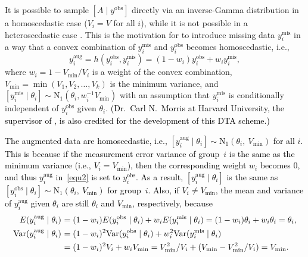 \documentclass[12pt]{article}
\begin{document}
It is possible to  sample $[A\mid y^{\textrm{obs}}]$ directly via an inverse-Gamma distribution in a homoscedastic case ($V_i=V$ for all $i$), while it is not possible in a heteroscedastic case \citep{everson2000inference}. This is the motivation for \cite{kelly2014advances}   to introduce missing data $y^{\textrm{mis}}_i$ in a  way that a convex combination of  $y^{\textrm{mis}}_i$  and $y^{\textrm{obs}}_i$ becomes homoscedastic, i.e., 
\begin{equation}\label{equ2}
y^{\textrm{aug}}_i=h(y^{\textrm{obs}}_i, y^{\textrm{mis}}_i)=(1-w_i)y^{\textrm{obs}}_i+w_iy^{\textrm{mis}}_i,
\end{equation}
where $w_i=1-V_\textrm{min} /V_i$ is a weight of the convex combination, $V_\textrm{min}=\min(V_1, V_2, \ldots, V_k)$ is the minimum variance, and $[y^{\textrm{mis}}_i\mid \theta_i]\sim \textrm{N}_1(\theta_i, w_i^{-1}V_{\textrm{min}})$  with an assumption that $y^{\textrm{mis}}_i$ is conditionally independent of $y^{\textrm{obs}}_i$ given $\theta_i$.  \textcolor{black}{(Dr.~Carl N.~Morris at Harvard University, the  supervisor of \cite{kelly2014advances}, is also credited for the development of this DTA scheme.)}


\textcolor{black}{The augmented data are homoscedastic, i.e., $[y^{\textrm{aug}}_i\mid \theta_i]\sim \textrm{N}_1(\theta_i,~ V_\textrm{min})$  for all $i$. This is because if the measurement error variance of group~$i$ is the same as the minimum variance (i.e., $V_i=V_{\textrm{min}}$), then the corresponding weight  $w_i$ becomes 0, and thus $y^{\textrm{aug}}_i$  in~\eqref{equ2} is set to $y^{\textrm{obs}}_i$. As a result, $[y^{\textrm{aug}}_i\mid \theta_i]$ is the same as $[y^{\textrm{obs}}_i\mid \theta_i]\sim \textrm{N}_{1}(\theta_i,~ V_{\textrm{min}})$ for group~$i$. Also, if  $V_i\neq V_{\textrm{min}}$, the mean and variance of $y^{\textrm{aug}}_i$ given $\theta_i$ are still $\theta_i$ and $V_{\textrm{min}}$, respectively, because}
\begin{align}
\textcolor{black}{E(y^{\textrm{aug}}_i\mid \theta_i)}~&\textcolor{black}{=(1-w_i)E(y^{\textrm{obs}}_i\mid\theta_i)+w_iE(y^{\textrm{mis}}_i\mid \theta_i)=(1-w_i)\theta_i+w_i\theta_i=\theta_i,}\nonumber\\
\textcolor{black}{\textrm{Var}(y^{\textrm{aug}}_i\mid \theta_i)}~&\textcolor{black}{=(1-w_i)^2\textrm{Var}(y^{\textrm{obs}}_i\mid \theta_i)+w_i^2\textrm{Var}(y^{\textrm{mis}}_i\mid \theta_i)}\nonumber\\
&\textcolor{black}{=(1-w_i)^2V_i+w_iV_{\textrm{min}}=V_{\textrm{min}}^2/V_i+(V_{\textrm{min}}-V_{\textrm{min}}^2/V_i)=V_{\textrm{min}}}.\nonumber
\end{align}
\end{document}
